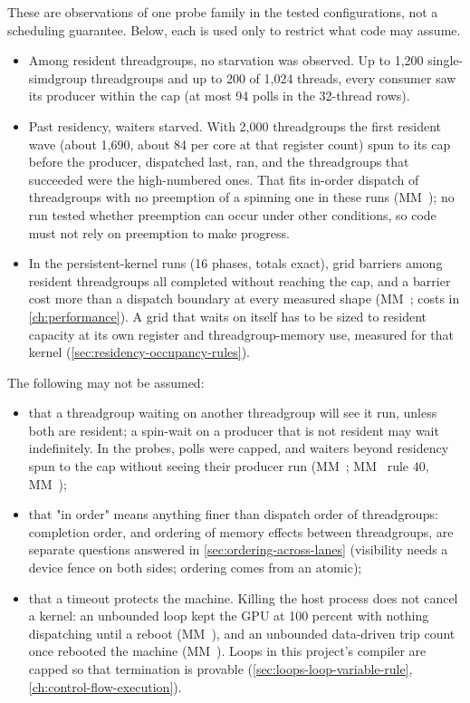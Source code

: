 These are observations of one probe family in the tested configurations, not a scheduling guarantee. Below, each is
used only to restrict what code may assume.

\begin{itemize}
\item Among resident threadgroups, no starvation was observed. Up to 1,200 single-simdgroup threadgroups and up to 200
  of 1,024 threads, every consumer saw its producer within the cap (at most 94 polls in the 32-thread rows).
\item Past residency, waiters starved. With 2,000 threadgroups the first resident wave (about 1,690, about 84 per core at
  that register count) spun to its cap before the producer, dispatched last, ran, and the threadgroups that
  succeeded were the high-numbered ones. That fits in-order dispatch of threadgroups with no preemption of a
  spinning one in these runs (MM~); no run tested whether preemption can occur under other
  conditions, so code must not rely on preemption to make progress.
\item In the persistent-kernel runs (16 phases, totals exact), grid barriers among resident threadgroups all completed
  without reaching the cap, and a barrier cost more than a dispatch boundary at every measured shape (MM~;
  costs in \cref{ch:performance}). A grid that waits on itself has to be sized to resident capacity at its own
  register and threadgroup-memory use, measured for that kernel (\cref{sec:residency-occupancy-rules}).
\end{itemize}

The following may not be assumed:

\begin{itemize}
\item that a threadgroup waiting on another threadgroup will see it run, unless both are resident; a spin-wait on a
  producer that is not resident may wait indefinitely. In the probes, polls were capped, and waiters beyond residency
  spun to the cap without seeing their producer run (MM~; MM~ rule 40, MM~);
\item that "in order" means anything finer than dispatch order of threadgroups: completion order, and ordering of memory
  effects between threadgroups, are separate questions answered in \cref{sec:ordering-across-lanes} (visibility needs a device fence on both
  sides; ordering comes from an atomic);
\item that a timeout protects the machine. Killing the host process does not cancel a kernel: an unbounded loop kept the GPU
  at 100 percent with nothing dispatching until a reboot (MM~), and an unbounded data-driven trip count once
  rebooted the machine (MM~). Loops in this project's compiler are capped so that termination is provable
  (\cref{sec:loops-loop-variable-rule}, \cref{ch:control-flow-execution}).
\end{itemize}

